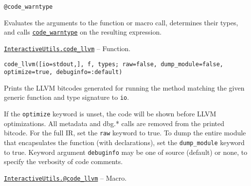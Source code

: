 \begin{adjustwidth}{2em}{0pt}


\begin{verbatim}
@code_warntype
\end{verbatim}

Evaluates the arguments to the function or macro call, determines their types, and calls \hyperlink{5565852192659724503}{\texttt{code\_warntype}} on the resulting expression.



\end{adjustwidth}
\hypertarget{1749471484368489435}{} 
\hyperlink{1749471484368489435}{\texttt{InteractiveUtils.code\_llvm}}  -- {Function.}

\begin{adjustwidth}{2em}{0pt}


\begin{verbatim}
code_llvm([io=stdout,], f, types; raw=false, dump_module=false, optimize=true, debuginfo=:default)
\end{verbatim}

Prints the LLVM bitcodes generated for running the method matching the given generic function and type signature to \texttt{io}.

If the \texttt{optimize} keyword is unset, the code will be shown before LLVM optimizations. All metadata and dbg.* calls are removed from the printed bitcode. For the full IR, set the \texttt{raw} keyword to true. To dump the entire module that encapsulates the function (with declarations), set the \texttt{dump\_module} keyword to true. Keyword argument \texttt{debuginfo} may be one of source (default) or none, to specify the verbosity of code comments.



\end{adjustwidth}
\hypertarget{18039596607712979441}{} 
\hyperlink{18039596607712979441}{\texttt{InteractiveUtils.@code\_llvm}}  -- {Macro.}

